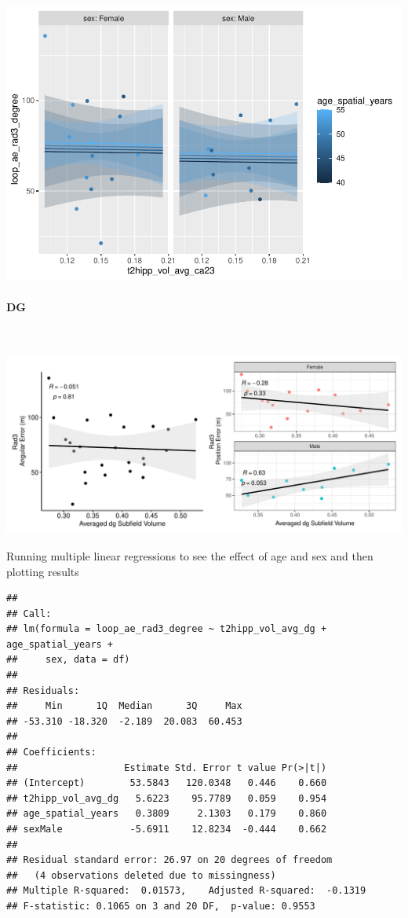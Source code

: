 \documentclass[
]{article}
\begin{document}
\includegraphics{hippocampal_subfield_files/figure-latex/avg CA2/3 + rad3 angular errorMLR-1.pdf}
\vspace{1cm}

\newpage
\paragraph{DG}

~ \vspace{1cm}

\includegraphics{hippocampal_subfield_files/figure-latex/unnamed-chunk-10-1.pdf}

\vspace{1cm}

Running multiple linear regressions to see the effect of age and sex and
then plotting results

\begin{verbatim}
## 
## Call:
## lm(formula = loop_ae_rad3_degree ~ t2hipp_vol_avg_dg + age_spatial_years + 
##     sex, data = df)
## 
## Residuals:
##     Min      1Q  Median      3Q     Max 
## -53.310 -18.320  -2.189  20.083  60.453 
## 
## Coefficients:
##                   Estimate Std. Error t value Pr(>|t|)
## (Intercept)        53.5843   120.0348   0.446    0.660
## t2hipp_vol_avg_dg   5.6223    95.7789   0.059    0.954
## age_spatial_years   0.3809     2.1303   0.179    0.860
## sexMale            -5.6911    12.8234  -0.444    0.662
## 
## Residual standard error: 26.97 on 20 degrees of freedom
##   (4 observations deleted due to missingness)
## Multiple R-squared:  0.01573,    Adjusted R-squared:  -0.1319 
## F-statistic: 0.1065 on 3 and 20 DF,  p-value: 0.9553
\end{verbatim}
\end{document}
